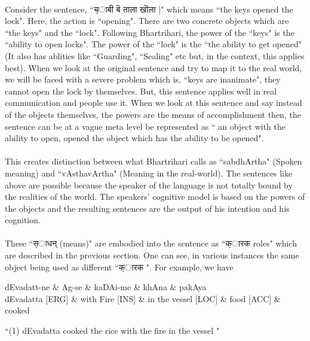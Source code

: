 \documentclass[a4paper,10pt]{article}
\begin{document}
\paragraph{} Consider the sentence, ``{\d चाबी बॆ ताला खॊला }|" which means ``the keys opened the lock". Here, the action is ``opening". 
There are two concrete objects which are ``the keys" and the ``lock". Following Bhartrihari, the power of the ``keys" is the ``ability to open locks". 
The power of the ``lock" is the ``the ability to get opened" (It also has ablities like ``Guarding", ``Sealing" etc but, in the context, this applies best). 
When we look at the original sentence and try to map it to the real world, we will be faced with a severe problem which is, ``keys are inanimate", 
they cannot open the lock by themselves. But, this sentence applies well in real communication and people use it. When we look at this sentence and say 
instead of the objects themselves, the powers are the means of accomplishment then, the sentence can be at a vague meta level be represented as 
`` an object with the ability to open, opened the object which has the ability to be opened". 

\paragraph{} This creates distinction between what Bhartrihari calls as ``sabdhArtha" (Spoken meaning) and ``vAsthavArtha" (Meaning in the real-world). 
The sentences like above are possible because the speaker of the language is not totally bound by the realities of the world. 
The speakers' cognitive model is based on the powers of the objects and the resulting sentences are the output of his intention and his cognition.

\paragraph{} These ``{\d साधन्} (means)" are embodied into the sentence as ``{\d कारक } roles" which are described in the previous section. 
One can see, in various instances the same object being used as different ``{\d कारक }". For example, we have 
\hypertarget{fig1}{}

\begin{center}
\begin{dependency}[arc edge, arc angle=80, text only label, label style={above}]
   \begin{deptext}[column sep=1em]
      dEvadatt-ne \& Ag-se \& kaDAi-me \& khAna \& pakAya \\
      dEvadatta [ERG] \& with Fire [INS] \& in the vessel [LOC] \& food [ACC]  \& cooked \\
   \end{deptext}
\end{dependency} 

 ``(1) dEvadatta cooked the rice with the fire in the vessel " 
 

\end{center}
\end{document}
